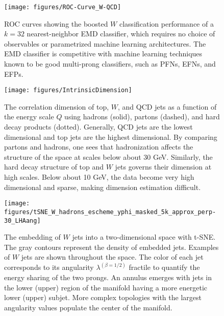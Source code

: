 \documentclass[aps,prl,twocolumn,preprintnumbers,nofootinbib,longbibliography,floatfix]{revtex4-1}
\begin{document}
\begin{figure}[t]
\centering
\texttt{[image: figures/ROC-Curve\_W-QCD]}
\caption{ROC curves showing the boosted $W$ classification performance of a $k=32$ nearest-neighbor EMD classifier, which requires no choice of observables or parametrized machine learning architectures.
%
The EMD classifier is competitive with machine learning techniques known to be good multi-prong classifiers, such as PFNs, EFNs, and EFPs.}
\label{fig:rocs}
\end{figure}


\begin{figure}[t]
\centering
\texttt{[image: figures/IntrinsicDimension]}
\caption{The correlation dimension of top, $W$, and QCD jets as a function of the energy scale $Q$ using hadrons (solid), partons (dashed), and hard decay products (dotted).
%
Generally, QCD jets are the lowest dimensional and top jets are the highest dimensional.
%
By comparing partons and hadrons, one sees that hadronization affects the structure of the space at scales below about 30 GeV.
%
Similarly, the hard decay structure of top and $W$ jets governs their dimension at high scales.
%
Below about 10 GeV, the data become very high dimensional and sparse, making dimension estimation difficult.}
\label{fig:intdim}
\end{figure}


\begin{figure}[t]
\centering
\texttt{[image: figures/tSNE\_W\_hadrons\_escheme\_yphi\_masked\_5k\_approx\_perp-30\_LHAang]}
\caption{The embedding of $W$ jets into a two-dimensional space with t-SNE.
%
The gray contours represent the density of embedded jets.
%
Examples of $W$ jets are shown throughout the space.
%
The color of each jet corresponds to its angularity $\lambda^{(\beta=1/2)}$ fractile to quantify the energy sharing of the two prongs.
%
An annulus emerges with jets in the lower (upper) region of the manifold having a more energetic lower (upper) subjet.
%
More complex topologies with the largest angularity values populate the center of the manifold.}
\label{fig:tsne} 
\end{figure}
\end{document}
